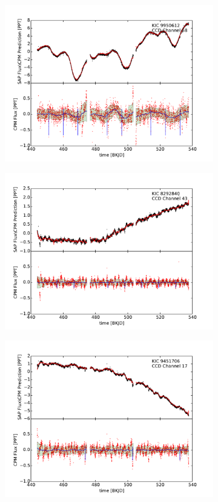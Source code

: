 \documentclass[12pt, preprint]{aastex}
\begin{document}
\begin{figure}[htb]
\begin{subfigure}[htb]{0.33\textwidth}
\includegraphics[width=\textwidth]{kic_9950612}
\end{subfigure}
\begin{subfigure}[htb]{0.33\textwidth}
\includegraphics[width=\textwidth]{kic_8292840}
\end{subfigure}%
\hfill
\begin{subfigure}[htb]{0.33\textwidth}
\includegraphics[width=\textwidth]{kic_9451706}

\end{subfigure}
\end{figure}
\end{document}
